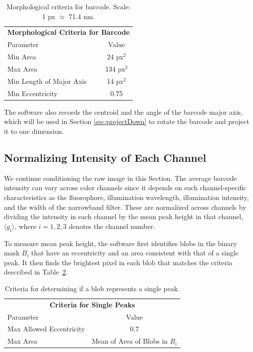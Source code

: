 \begin{table}[htbp] 
\begin{center}
\begin{tabular}{l c}
\multicolumn{2}{c}{\textbf{Morphological Criteria for Barcode}}\\
Parameter & Value \\
\hline
Min Area & 24 px$^2$ \\
Max Area & 134 px$^2$ \\
Min Length of Major Axis  & 14 px$^2$ \\
Min Eccentricity &0.75\\
\hline
\end{tabular}
\end{center}
\caption{Morphological criteria for barcode. Scale: 1 px $\approx$ 71.4 nm.\label{table:morphCriteria}}
\end{table}
The software also records the centroid and the angle of the barcode major axis, which will be used in Section \ref{sec:projectDown} to rotate the barcode and project it to one dimension. 



\subsection{Normalizing Intensity of Each Channel}\label{sec:normalizePeakHeight}
We continue conditioning the raw image in this Section. The average barcode intensity can vary across color channels since it depends on such channel-specific characteristics as the fluorophore, illumination wavelength, illumination intensity, and the width of the narrowband filter. These are normalized across channels by dividing the intensity in each channel by the mean peak height in that channel,  $\langle g_i \rangle$, where $i=1,2,3$ denotes the channel number. 

To measure mean peak height, the software first identifies blobs in the binary mask $B_i$ that have an eccentricity and an area consistent with that of a single peak. It then finds the brightest pixel in each blob that matches the criteria described in Table~\ref{table:singlePeak}.

\begin{table}[htbp] 	
\begin{center}
\begin{tabular}{l c}
\multicolumn{2}{c}{\textbf{Criteria for Single Peaks}}\\
Parameter & Value \\
\hline
Max Allowed Eccentricity  & 0.7 \\
Max Area &  Mean of Area of Blobs in $B_i$ \\
\hline
\end{tabular}
\caption{Criteria for determining if a blob represents a single peak. \label{table:singlePeak}}
\end{center}
\end{table}

